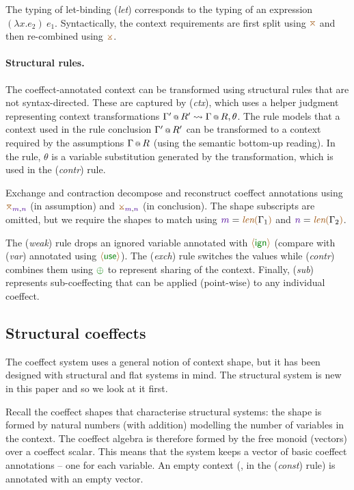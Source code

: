 The typing of let-binding (\emph{let}) corresponds to the typing of an expression $(\lambda x.e_2)~e_1$.
Syntactically, the context requirements are first split using $\amerge$ and then re-combined
using $\asplit$. 

\paragraph{Structural rules.}
The coeffect-annotated context can be transformed using structural rules that are
not syntax-directed. These are captured by (\emph{ctx}), which uses a helper judgment representing
context transformations $\ctxtrans{ \coctx{\Gamma}{R} }{ \coctx{\Gamma'}{R'} }{\theta}$.
The rule models that a context used in the rule conclusion $\coctx{\Gamma'}{R'}$ can be transformed
to a context required by the assumptions $\coctx{\Gamma}{R}$ (using the semantic bottom-up reading).
In the rule, $\theta$ is a variable substitution generated by the transformation, which is 
used in the (\emph{contr}) rule.

Exchange and contraction decompose and reconstruct coeffect annotations 
using $\amerge_{\sclrd{m},\sclrd{n}}$ (in assumption) and $\asplit_{\sclrd{m},\sclrd{n}}$ (in conclusion). 
The shape subscripts are omitted, but we require the shapes to match using $\sclrd{m} = \slift{\Gamma_1}$
and $\sclrd{n} = \slift{\Gamma_2}$. 

The (\emph{weak}) rule drops an ignored variable annotated with $\aweak$ (compare with (\emph{var})
annotated using $\aunit$). The (\emph{exch}) rule switches the values 
while (\emph{contr}) combines them using $\cpar$ to represent sharing of the context.
Finally, (\emph{sub}) represents sub-coeffecting that can be applied (point-wise) to any
individual coeffect.


\subsection{Structural coeffects}
\label{sec:unified-structural}

The coeffect system uses a general notion of context shape, but
it has been designed with structural and flat systems in
mind. The structural system is new in this paper and so we
look at it first.

Recall the coeffect shapes that characterise structural systems: the shape is formed by natural
numbers (with addition) modelling the number of variables in the
context. The coeffect algebra is therefore formed by the free monoid
(vectors) over a coeffect scalar. This means that the system keeps a vector
of basic coeffect annotations -- one for each variable. An empty
context (\eg{}, in the (\emph{const}) rule) is annotated with an empty
vector.

